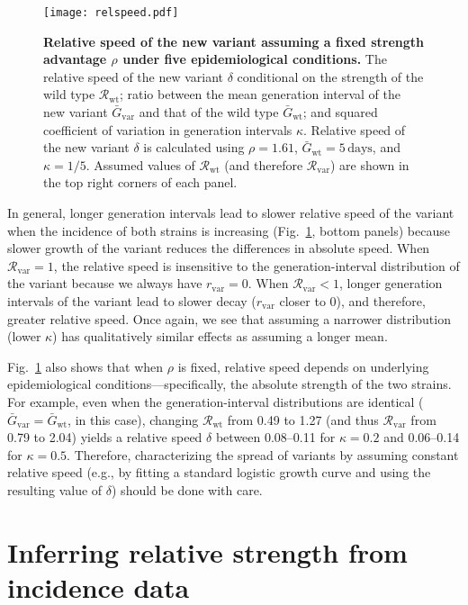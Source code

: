 \documentclass[12pt]{article}
\newcommand{\fref}[1]{Fig.~\ref{fig:#1}}
\newcommand{\vvvar}{\mathrm{var}}
\newcommand{\wwwt}{\mathrm{wt}}
\newcommand{\rx}[1]{\ensuremath{{r}_{#1}}\xspace}
\newcommand{\rv}{\rx{\vvvar}}
\newcommand{\Rx}[1]{\ensuremath{{\mathcal R}_{#1}}\xspace}
\newcommand{\Rw}{\Rx{\wwwt}}
\newcommand{\Rv}{\Rx{\vvvar}}
\newcommand{\days}{\ensuremath{\, \textrm{days}}}
\newcommand{\Gx}[1]{\ensuremath{{\bar G}_{#1}}\xspace}
\newcommand{\Gw}{\Gx{\wwwt}}
\newcommand{\Gv}{\Gx{\vvvar}}
\begin{document}
\begin{figure}[!th]
\texttt{[image: relspeed.pdf]}
\caption{
\textbf{Relative speed of the new variant assuming a fixed strength advantage $\rho$ under five epidemiological conditions.}
The relative speed of the new variant $\delta$ conditional on the strength of the wild type $\Rw$; ratio between the mean generation interval of the new variant $\Gv$ and that of the wild type $\Gw$; and squared coefficient of variation in generation intervals $\kappa$.
Relative speed of the new variant $\delta$ is calculated using $\rho=1.61$, $\Gw = 5\days$, and $\kappa = 1/5$.
Assumed values of $\Rw$ (and therefore $\Rv$) are shown in the top right corners of each panel.
}
\label{fig:relspeed}
\end{figure}

In general, longer generation intervals lead to slower relative speed of the variant when the incidence of both strains is increasing (\fref{relspeed}, bottom panels) because slower growth of the variant reduces the differences in absolute speed.
When $\Rv=1$, the relative speed is insensitive to the generation-interval distribution of the variant because we always have $\rv=0$.
When $\Rv<1$, longer generation intervals of the variant lead to slower decay ($\rv$ closer to 0), and therefore, greater relative speed.
Once again, we see that assuming a narrower distribution (lower $\kappa$) has qualitatively similar effects as assuming a longer mean.

\fref{relspeed} also shows that when $\rho$ is fixed, relative speed depends on underlying epidemiological conditions---specifically, the absolute strength of the two strains. 
For example, even when the generation-interval distributions are identical ($\Gv=\Gw$, in this case), changing $\Rw$ from 0.49 to 1.27 (and thus $\Rv$ from 0.79 to 2.04) yields a relative speed $\delta$ between 0.08--0.11 for $\kappa=0.2$ and 0.06--0.14 for $\kappa=0.5$.
Therefore, characterizing the spread of variants by assuming constant relative speed (e.g., by fitting a standard logistic growth curve \citep{switzerland2021variant} and using the resulting value of $\delta$) should be done with care.

\section{Inferring relative strength from incidence data}
\end{document}
